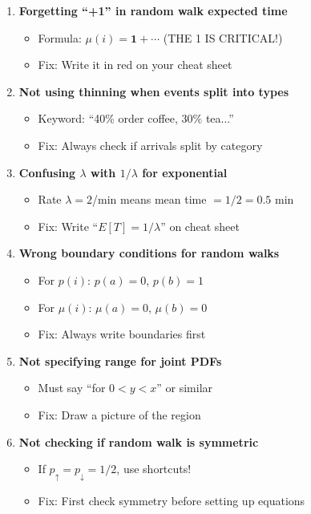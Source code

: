 \documentclass[10pt,letterpaper]{article}
\begin{document}
\begin{enumerate}[leftmargin=*]
  \item \textbf{Forgetting ``+1'' in random walk expected time}
    \begin{itemize}
      \item Formula: $\mu(i) = \mathbf{1} + \cdots$ (THE 1 IS CRITICAL!)
      \item Fix: Write it in red on your cheat sheet
    \end{itemize}

  \item \textbf{Not using thinning when events split into types}
    \begin{itemize}
      \item Keyword: ``40\% order coffee, 30\% tea...''
      \item Fix: Always check if arrivals split by category
    \end{itemize}

  \item \textbf{Confusing $\lambda$ with $1/\lambda$ for exponential}
    \begin{itemize}
      \item Rate $\lambda = 2$/min means mean time $= 1/2 = 0.5$ min
      \item Fix: Write ``$E[T] = 1/\lambda$'' on cheat sheet
    \end{itemize}

  \item \textbf{Wrong boundary conditions for random walks}
    \begin{itemize}
      \item For $p(i)$: $p(a) = 0$, $p(b) = 1$
      \item For $\mu(i)$: $\mu(a) = 0$, $\mu(b) = 0$
      \item Fix: Always write boundaries first
    \end{itemize}

  \item \textbf{Not specifying range for joint PDFs}
    \begin{itemize}
      \item Must say ``for $0 < y < x$'' or similar
      \item Fix: Draw a picture of the region
    \end{itemize}

  \item \textbf{Not checking if random walk is symmetric}
    \begin{itemize}
      \item If $p_{\uparrow} = p_{\downarrow} = 1/2$, use shortcuts!
      \item Fix: First check symmetry before setting up equations
    \end{itemize}


\end{enumerate}
\end{document}
